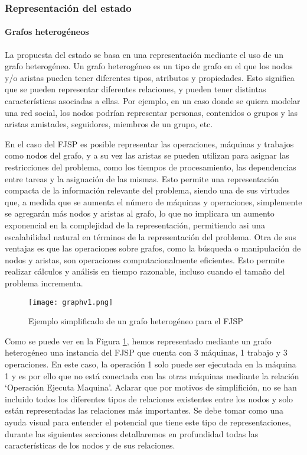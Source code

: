 \subsubsection{Representación del estado}
\paragraph{Grafos heterogéneos}
La propuesta del estado se basa en una representación mediante el uso de un grafo heterogéneo. Un grafo 
heterogéneo es un tipo de grafo en el que los nodos y/o aristas pueden tener diferentes tipos, atributos 
y propiedades. Esto significa que se pueden representar diferentes relaciones, y pueden tener distintas 
características asociadas a ellas. Por ejemplo, en un caso donde se quiera modelar una red social, 
los nodos podrían representar personas, contenidos o grupos y las aristas amistades, seguidores, 
miembros de un grupo, etc.\medskip 

En el caso del FJSP es posible representar las operaciones, máquinas y trabajos como nodos del grafo, 
y a su vez las aristas se pueden utilizan para asignar las restricciones del problema, como los tiempos de 
procesamiento, las dependencias entre tareas y la asignación de las mismas. Esto permite una representación 
compacta de la información relevante del problema, siendo una de sus virtudes que, a medida que se aumenta 
el número de máquinas y operaciones, simplemente se agregarán más nodos y aristas al grafo, lo que no 
implicara un aumento exponencial en la complejidad de la representación, permitiendo asi una escalabilidad 
natural en términos de la representación del problema. Otra de sus ventajas es que las operaciones sobre 
grafos, como la búsqueda o manipulación de nodos y aristas, son operaciones computacionalmente eficientes. 
Esto permite realizar cálculos y análisis en tiempo razonable, incluso cuando el tamaño del problema incrementa. 

\begin{figure}[ht]
    \centering
    \texttt{[image: graphv1.png]}
    \caption{Ejemplo simplificado de un grafo heterogéneo para el FJSP}
    \label{fig:grafo-heterogeneo}
\end{figure}

Como se puede ver en la Figura \ref{fig:grafo-heterogeneo}, hemos representado mediante un grafo
heterogéneo una instancia del FJSP que cuenta con 3 máquinas, 1 trabajo y 3 operaciones. En este caso, 
la operación 1 solo puede ser ejecutada en la máquina 1 y es por ello que no está conectada con 
las otras máquinas mediante la relación `Operación Ejecuta Maquina'. Aclarar que por motivos de 
simplifición, no se han incluido todos los diferentes tipos de relaciones existentes entre 
los nodos y solo están representadas las relaciones más importantes. Se debe tomar como una ayuda 
visual para entender el potencial que tiene este tipo de representaciones, durante las siguientes 
secciones detallaremos en profundidad todas las características de los nodos y de sus relaciones.

